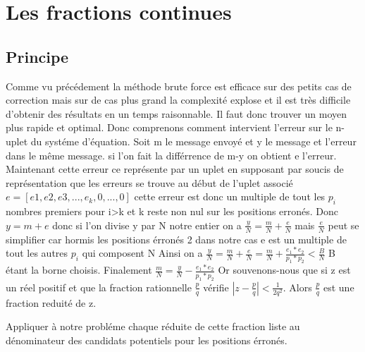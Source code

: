 \documentclass[a4paper, 11pt]{report}
\begin{document}
\newpage
\chapter{Les fractions continues} 
\section{Principe}
Comme vu précédement la méthode brute force est efficace sur des petits cas de correction mais sur de cas plus grand la complexité explose et il est très difficile d'obtenir des résultats en un temps raisonnable.\newline
Il faut donc trouver un moyen plus rapide et optimal. Donc comprenons comment intervient l'erreur sur le n-uplet du systéme d'équation.\newline
Soit m le message envoyé et y le message et l'erreur dans le même message. si l'on fait la différrence de m-y on obtient e l'erreur.
Maintenant cette erreur ce représente par un uplet en supposant par soucis de représentation que les erreurs se trouve au début de l'uplet associé
$e = [e1,e2,e3,...,e_k,0,...,0]$ cette erreur est donc un multiple de tout les $p_i$ nombres premiers pour i>k et k  reste non nul sur les positions erronés.\newline
Donc $y = m + e$ donc si l'on divise y par N notre entier on a $\frac{y}{N}=\frac{m}{N}+\frac{e}{N}$\newline
mais $\frac{e}{N}$ peut se simplifier car hormis les positions érronés 2 dans notre cas e est un multiple de tout les autres $p_i$ qui composent N\newline
Ainsi on a  $\frac{y}{N}=\frac{m}{N}+\frac{e}{N}=\frac{m}{N}+ \frac{e_1 * e_2}{p_1 * p_2 } <\frac{B}{N} $    B étant la borne choisis.\newline
Finalement $\frac{m}{N}=\frac{y}{N} - \frac{e_1 * e_2}{p_1 * p_2 } $ \newline
\newline
Or souvenons-nous que si z est un réel positif et que la fraction rationnelle $\frac{p}{q}$
vérifie $ \left| z - \frac{p}{q} \right| < \frac{1}{2q^2} $. 
Alors $\frac{p}{q}$ est une fraction reduité de z.\newline
\newline

Appliquer à notre probléme chaque réduite de cette fraction liste au dénominateur des candidats potentiels pour les positions érronés.\newline
\end{document}
